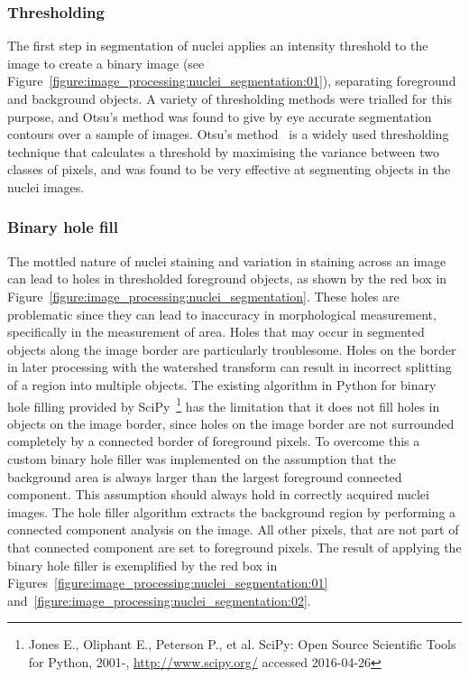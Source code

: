 \subsubsection{Thresholding}
The first step in segmentation of nuclei applies an intensity threshold to the image to create a binary image (see Figure~\ref{figure:image_processing:nuclei_segmentation:01}), separating foreground and background objects. A variety of thresholding methods were trialled for this purpose, and Otsu's method was found to give by eye accurate segmentation contours over a sample of images. Otsu's method~\cite{Otsu1979} is a widely used thresholding technique that calculates a threshold by maximising the variance between two classes of pixels, and was found to be very effective at segmenting objects in the nuclei images.

\subsubsection{Binary hole fill}
The mottled nature of nuclei staining and variation in staining across an image can lead to holes in thresholded foreground objects, as shown by the red box in Figure~\ref{figure:image_processing:nuclei_segmentation}. These holes are problematic since they can lead to inaccuracy in morphological measurement, specifically in the measurement of area. Holes that may occur in segmented objects along the image border are particularly troublesome. Holes on the border in later processing with the watershed transform can result in incorrect splitting of a region into multiple objects. The existing algorithm in Python for binary hole filling provided by SciPy~\footnote{Jones E., Oliphant E., Peterson P., et al. SciPy: Open Source Scientific Tools for Python, 2001-, \url{http://www.scipy.org/} accessed 2016-04-26} has the limitation that it does not fill holes in objects on the image border, since holes on the image border are not surrounded completely by a connected border of foreground pixels. To overcome this a custom binary hole filler was implemented on the assumption that the background area is always larger than the largest foreground connected component. This assumption should always hold in correctly acquired nuclei images. The hole filler algorithm extracts the background region by performing a connected component analysis on the image. All other pixels, that are not part of that connected component are set to foreground pixels. The result of applying the binary hole filler is exemplified by the red box in Figures~\ref{figure:image_processing:nuclei_segmentation:01} and~\ref{figure:image_processing:nuclei_segmentation:02}.

